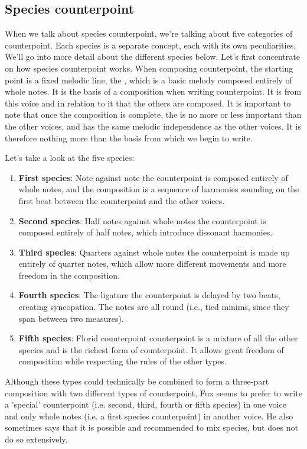 \subsection{Species counterpoint}\label{section:species-counterpoint}
When we talk about species counterpoint, we're talking about five categories of counterpoint. Each species is a separate concept, each with its own peculiarities. We'll go into more detail about the different species below. Let's first concentrate on how species counterpoint works. When composing counterpoint, the starting point is a fixed melodic line, the \cf, which is a basic melody composed entirely of whole notes. It is the basis of a composition when writing counterpoint. It is from this voice and in relation to it that the others are composed. It is important to note that once the composition is complete, the \cfs is no more or less important than the other voices, and has the same melodic independence as the other voices. It is therefore nothing more than the basis from which we begin to write.

Let's take a look at the five species:
\begin{enumerate}
    \item \textbf{First species}: Note against note \textendash{} the counterpoint is composed entirely of whole notes, and the composition is a sequence of harmonies sounding on the first beat between the counterpoint and the other voices.
    \item \textbf{Second species}: Half notes against whole notes \textendash{} the counterpoint is composed entirely of half notes, which introduce dissonant harmonies.
    \item \textbf{Third species}: Quarters against whole notes \textendash{} the counterpoint is made up entirely of quarter notes, which allow more different movements and more freedom in the composition.
    \item \textbf{Fourth species}: The ligature \textendash{} the counterpoint is delayed by two beats, creating syncopation. The notes are all round (i.e., tied minims, since they span between two measures).
    \item \textbf{Fifth species}: Florid counterpoint \textendash{} counterpoint is a mixture of all the other species and is the richest form of counterpoint. It allows great freedom of composition while respecting the rules of the other types.
\end{enumerate}

Although these types could technically be combined to form a three-part composition with two different types of counterpoint, Fux seems to prefer to write a 'special' counterpoint (i.e. second, third, fourth or fifth species) in one voice and only whole notes (i.e. a first species counterpoint) in another voice. He also sometimes says that it is possible and recommended to mix species, but does not do so extensively.


